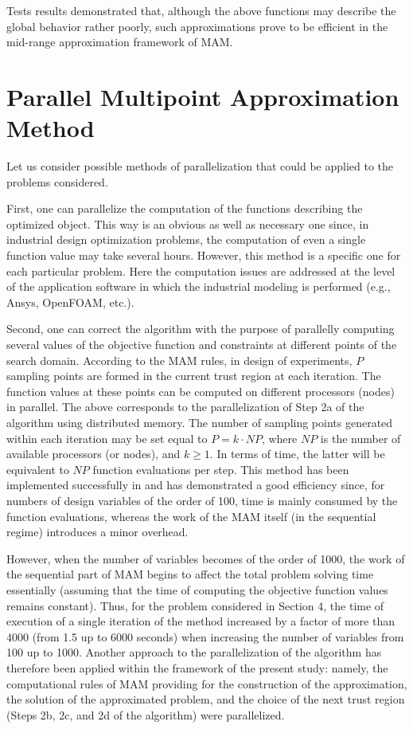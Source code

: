 \documentclass[runningheads,a4paper]{llncs}
\begin{document}
Tests results demonstrated that, although the above functions may describe the
global behavior rather poorly, such approximations prove to be efficient in the
mid-range approximation framework of MAM.

\section{Parallel Multipoint Approximation Method}\label{sec:par_alg}

Let us consider possible methods of parallelization that could be applied to
the problems considered.

First, one can parallelize the computation of the functions describing the
optimized object. This way is an obvious as well as necessary one since, in
industrial design optimization problems, the computation of even a single
function value may take several hours. However, this method is a specific one
for each particular problem. Here the computation issues are addressed at the
level of the application software in which the industrial modeling is performed
(e.g., Ansys, OpenFOAM, etc.).

Second, one can correct the algorithm with the purpose of parallelly computing
several values of the objective function and constraints at different points of
the search domain. According to the MAM rules, in design of experiments, $P$
sampling points are formed in the current trust region at each iteration. The
function values at these points can be computed on different processors (nodes)
in parallel. The above corresponds to the parallelization of Step 2a of the
algorithm using distributed memory. The number of sampling points generated
within each iteration may be set equal to $P = k\cdot NP$, where $NP$ is the
number of available processors (or nodes), and $k \geq 1$. In terms of time,
the latter will be equivalent to $NP$ function evaluations per step. This
method has been implemented successfully in \cite{PolynkinToropov2008} and has
demonstrated a good efficiency since, for numbers of design variables of the
order of 100, time is mainly consumed by the function evaluations, whereas the
work of the MAM itself (in the sequential regime) introduces a minor overhead.

However, when the number of variables becomes of the order of 1000, the work of
the sequential part of MAM begins to affect the total problem solving time
essentially (assuming that the time of computing the objective function values
remains constant). Thus, for the problem considered in Section 4, the time of
execution of a single iteration of the method increased by a factor of more
than 4000 (from 1.5 up to 6000 seconds) when increasing the number of variables
from 100 up to 1000. Another approach to the parallelization of the algorithm
has therefore been applied within the framework of the present study: namely,
the computational rules of MAM  providing for the construction of the
approximation, the solution of the approximated problem, and the choice of the
next trust region (Steps 2b, 2c, and 2d of the algorithm) were parallelized.
\end{document}
